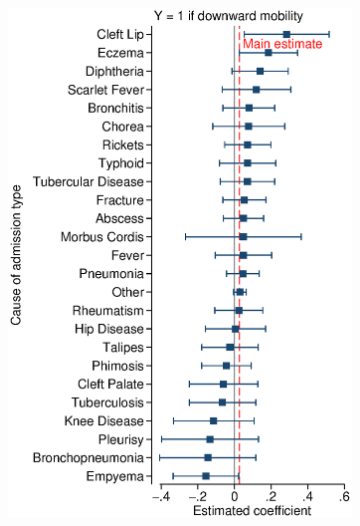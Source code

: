 \documentclass[12pt,english]{article}
\begin{document}
\begin{figure}[!ht]
\begin{subfigure}{0.325\textwidth}
	\includegraphics[width=1.00\linewidth]{../output/02_appendix/figure_a09_panel_2.eps}
\end{subfigure}
\begin{subfigure}{0.325\textwidth}
	\centering

\end{subfigure}
\end{figure}
\end{document}
